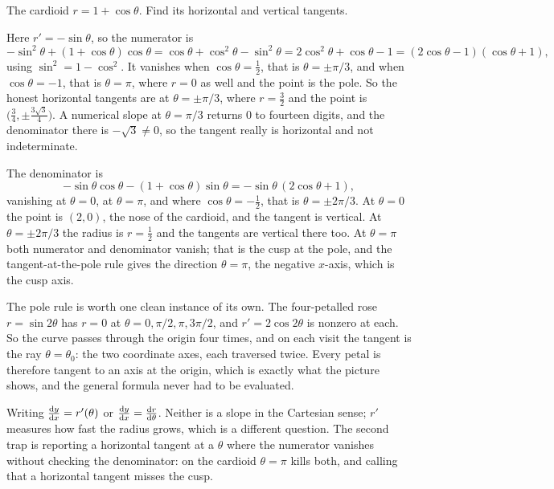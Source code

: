 \begin{worked}
The cardioid $r=1+\cos\theta$. Find its horizontal and vertical tangents.

Here $r'=-\sin\theta$, so the numerator is
\[
-\sin^{2}\theta+(1+\cos\theta)\cos\theta=\cos\theta+\cos^{2}\theta-\sin^{2}\theta=2\cos^{2}\theta+\cos\theta-1=(2\cos\theta-1)(\cos\theta+1),
\]
using $\sin^{2}=1-\cos^{2}$. It vanishes when $\cos\theta=\tfrac12$, that is $\theta=\pm\pi/3$, and when $\cos\theta=-1$, that is $\theta=\pi$, where $r=0$ as well and the point is the pole. So the honest horizontal tangents are at $\theta=\pm\pi/3$, where $r=\tfrac32$ and the point is $\bigl(\tfrac34,\pm\tfrac{3\sqrt3}{4}\bigr)$. A numerical slope at $\theta=\pi/3$ returns $0$ to fourteen digits, and the denominator there is $-\sqrt3\neq0$, so the tangent really is horizontal and not indeterminate.

The denominator is
\[
-\sin\theta\cos\theta-(1+\cos\theta)\sin\theta=-\sin\theta\,(2\cos\theta+1),
\]
vanishing at $\theta=0$, at $\theta=\pi$, and where $\cos\theta=-\tfrac12$, that is $\theta=\pm2\pi/3$. At $\theta=0$ the point is $(2,0)$, the nose of the cardioid, and the tangent is vertical. At $\theta=\pm2\pi/3$ the radius is $r=\tfrac12$ and the tangents are vertical there too. At $\theta=\pi$ both numerator and denominator vanish; that is the cusp at the pole, and the tangent-at-the-pole rule gives the direction $\theta=\pi$, the negative $x$-axis, which is the cusp axis.

The pole rule is worth one clean instance of its own. The four-petalled rose $r=\sin2\theta$ has $r=0$ at $\theta=0,\pi/2,\pi,3\pi/2$, and $r'=2\cos2\theta$ is nonzero at each. So the curve passes through the origin four times, and on each visit the tangent is the ray $\theta=\theta_{0}$: the two coordinate axes, each traversed twice. Every petal is therefore tangent to an axis at the origin, which is exactly what the picture shows, and the general formula never had to be evaluated.
\end{worked}

\begin{trap}
Writing $\frac{\mathrm{d}y}{\mathrm{d}x}=r'(\theta)$ or $\frac{\mathrm{d}y}{\mathrm{d}x}=\frac{\mathrm{d}r}{\mathrm{d}\theta}$. Neither is a slope in the Cartesian sense; $r'$ measures how fast the radius grows, which is a different question. The second trap is reporting a horizontal tangent at a $\theta$ where the numerator vanishes without checking the denominator: on the cardioid $\theta=\pi$ kills both, and calling that a horizontal tangent misses the cusp.
\end{trap}


